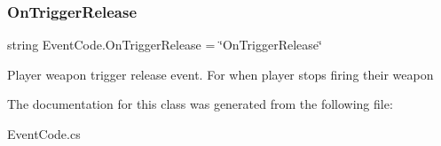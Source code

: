 \subsubsection{\texorpdfstring{OnTriggerRelease}{OnTriggerRelease}}
{\footnotesize\ttfamily string Event\+Code.\+On\+Trigger\+Release = \char`\"{}On\+Trigger\+Release\char`\"{}\hspace{0.3cm}{\ttfamily [static]}}



Player weapon trigger release event. For when player stops firing their weapon 



The documentation for this class was generated from the following file\+:\begin{DoxyCompactItemize}
\item 
Event\+Code.\+cs\end{DoxyCompactItemize}
